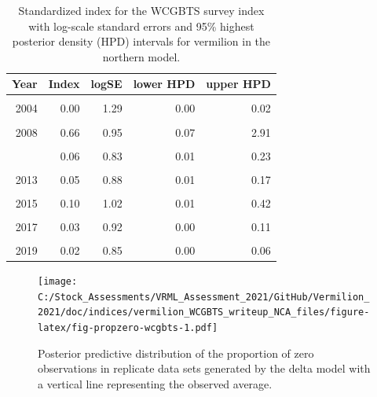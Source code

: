 \documentclass[11pt,
  english,
]{article}
\begin{document}
\begin{table}

\caption{\label{tab:tab-index-wcgbts}Standardized index for the WCGBTS survey index with log-scale standard errors and 95\% highest
       posterior density (HPD) intervals for vermilion in the northern model.}
\centering
\begin{tabular}[t]{rrrrr}
\toprule
Year & Index & logSE & lower HPD & upper HPD\\
\midrule
\cellcolor{gray!6}{2003} & \cellcolor{gray!6}{0.20} & \cellcolor{gray!6}{1.08} & \cellcolor{gray!6}{0.01} & \cellcolor{gray!6}{0.91}\\
2004 & 0.00 & 1.29 & 0.00 & 0.02\\
\cellcolor{gray!6}{2006} & \cellcolor{gray!6}{0.39} & \cellcolor{gray!6}{1.41} & \cellcolor{gray!6}{0.01} & \cellcolor{gray!6}{2.23}\\
2008 & 0.66 & 0.95 & 0.07 & 2.91\\
\cellcolor{gray!6}{2009} & \cellcolor{gray!6}{0.33} & \cellcolor{gray!6}{1.44} & \cellcolor{gray!6}{0.01} & \cellcolor{gray!6}{1.89}\\
\addlinespace
2010 & 0.06 & 0.83 & 0.01 & 0.23\\
\cellcolor{gray!6}{2012} & \cellcolor{gray!6}{0.13} & \cellcolor{gray!6}{0.93} & \cellcolor{gray!6}{0.01} & \cellcolor{gray!6}{0.48}\\
2013 & 0.05 & 0.88 & 0.01 & 0.17\\
\cellcolor{gray!6}{2014} & \cellcolor{gray!6}{0.07} & \cellcolor{gray!6}{1.37} & \cellcolor{gray!6}{0.00} & \cellcolor{gray!6}{0.36}\\
2015 & 0.10 & 1.02 & 0.01 & 0.42\\
\addlinespace
\cellcolor{gray!6}{2016} & \cellcolor{gray!6}{0.21} & \cellcolor{gray!6}{0.83} & \cellcolor{gray!6}{0.03} & \cellcolor{gray!6}{0.75}\\
2017 & 0.03 & 0.92 & 0.00 & 0.11\\
\cellcolor{gray!6}{2018} & \cellcolor{gray!6}{0.01} & \cellcolor{gray!6}{0.99} & \cellcolor{gray!6}{0.00} & \cellcolor{gray!6}{0.05}\\
2019 & 0.02 & 0.85 & 0.00 & 0.06\\
\bottomrule
\end{tabular}
\end{table}

\FloatBarrier

\begin{figure}
\centering
\texttt{[image: C:/Stock\_Assessments/VRML\_Assessment\_2021/GitHub/Vermilion\_2021/doc/indices/vermilion\_WCGBTS\_writeup\_NCA\_files/figure-latex/fig-propzero-wcgbts-1.pdf]}
\caption{\label{fig:fig-propzero-wcgbts}Posterior predictive distribution of the proportion of zero observations in replicate data sets generated by the delta model with a vertical line representing the observed average.}
\end{figure}
\end{document}
